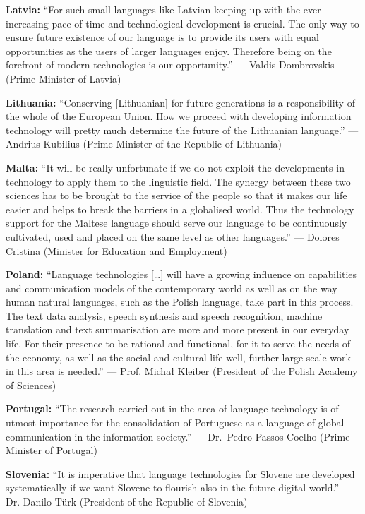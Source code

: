 \documentclass[10pt, plain]{../../metanetpaper}
\begin{document}
\bigskip \textbf{Latvia:} ``For such small languages like Latvian keeping up with the ever increasing pace of time and technological development is crucial. The only way to ensure future existence of our language is to provide its users with equal opportunities as the users of larger languages enjoy. Therefore being on the forefront of modern technologies is our opportunity.'' --- Valdis Dombrovskis (Prime Minister of Latvia)

\bigskip \textbf{Lithuania:} ``Conserving [Lithuanian] for future generations is a responsibility of the whole of the European Union. How we proceed with developing information technology will pretty much determine the future of the Lithuanian language.'' --- Andrius Kubilius (Prime Minister of the Republic of Lithuania)

\bigskip \textbf{Malta:} ``It will be really unfortunate if we do not exploit the developments in technology to apply them to the linguistic field. The synergy between these two sciences has to be brought to the service of the people so that it makes our life easier and helps to break the barriers in a globalised world. Thus the technology support for the Maltese language should serve our language to be continuously cultivated, used and placed on the same level as other languages.'' --- Dolores Cristina (Minister for Education and Employment)

\bigskip \textbf{Poland:} ``Language technologies [\dots] will have a growing influence on capabilities and communication models of the contemporary world as well as on the way human natural languages, such as the Polish language, take part in this process. The text data analysis, speech synthesis and speech recognition, machine translation and text summarisation are more and more present in our everyday life. For their presence to be rational and functional, for it to serve the needs of the economy, as well as the social and cultural life well, further large-scale work in this area is needed.'' --- Prof. Michał Kleiber (President of the Polish Academy of Sciences)

\bigskip \textbf{Portugal:} ``The research carried out in the area of language technology is of utmost importance for the consolidation of Portuguese as a language of global communication in the information society.'' --- Dr.~Pedro Passos Coelho (Prime-Minister of Portugal)

\bigskip \textbf{Slovenia:} ``It is imperative that language technologies for Slovene are developed systematically if we want Slovene to flourish also in the future digital world.'' --- Dr. Danilo Türk (President of the Republic of Slovenia)
\end{document}
